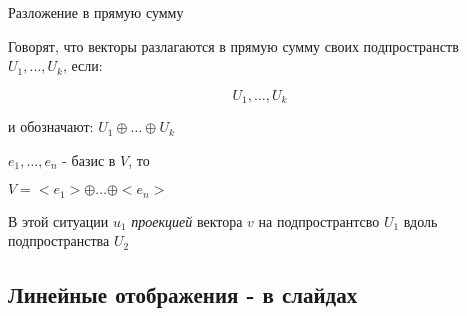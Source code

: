 \begin{definition} Разложение в прямую сумму
    
    Говорят, что векторы разлагаются в прямую сумму своих подпространств $U_1, \dots, U_k$, если:

    $$U_1, \dots, U_k$$

    и обозначают: $U_1 \oplus \dots \oplus U_k$

    \begin{example}
        
        $e_1, \dots, e_n$ - базис в $V$, то 

        $V = <e_1> \oplus \dots \oplus <e_n>$

    \end{example}

    \begin{comment}
        
        \begin{enumerate}
            \item При $k = 2$
            \item $V = U_1 \oplus U_2 \Leftrightarrow \begin{cases}
                V = U_1 + U_2 \\
                U_1 \cap U_2 = \vec{0}
            \end{cases} \Leftrightarrow \begin{cases}
                \dim V = \dim U_1 + \dim U_2 \\
                U_1 \cap U_2 = \{\vec{0}\}
            \end{cases}$
            \item $V = U_1 \oplus U_2 \Rightarrow \forall v \in V: \; \exists ! u_1 \in U_1, u_2 \in U_2: \; V = U_1 + U_2$
        \end{enumerate}

    \end{comment}

\end{definition}


\bigskip


\begin{definition}
    
    В этой ситуации $u_1$ \textit{проекцией} вектора $v$ на подпространтсво $U_1$ вдоль подпространства $U_2$

\end{definition}


\subsection{Линейные отображения - в слайдах}